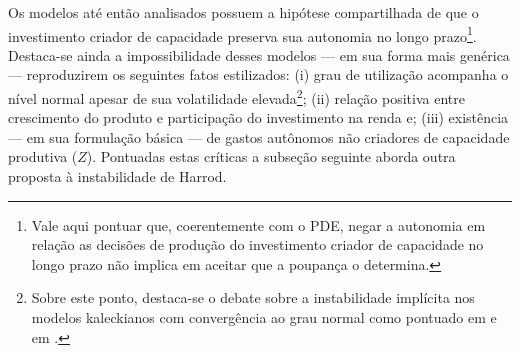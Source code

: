  
Os modelos até então analisados possuem a hipótese compartilhada de que o investimento criador de capacidade preserva sua autonomia no longo prazo\footnote{Vale aqui pontuar que, coerentemente com o PDE, negar a autonomia em relação as decisões de produção do investimento criador de capacidade no longo prazo não implica em aceitar que a poupança o determina.}.  
Destaca-se ainda a impossibilidade desses modelos --- em sua forma mais genérica --- reproduzirem os seguintes fatos estilizados: 
(i) grau de utilização acompanha o nível normal apesar de sua volatilidade elevada\footnote{Sobre este ponto, destaca-se o debate sobre a instabilidade implícita nos modelos kaleckianos com convergência ao grau normal como pontuado em \textcite{hein_instability_2011} e em \textcite{allain_tackling_2015}.}; 
(ii) relação positiva entre crescimento do produto e participação do investimento na renda e;
(iii) existência --- em sua formulação básica --- de gastos autônomos não criadores de capacidade produtiva ($Z$).
Pontuadas estas críticas a subseção seguinte aborda outra proposta à instabilidade de Harrod.


